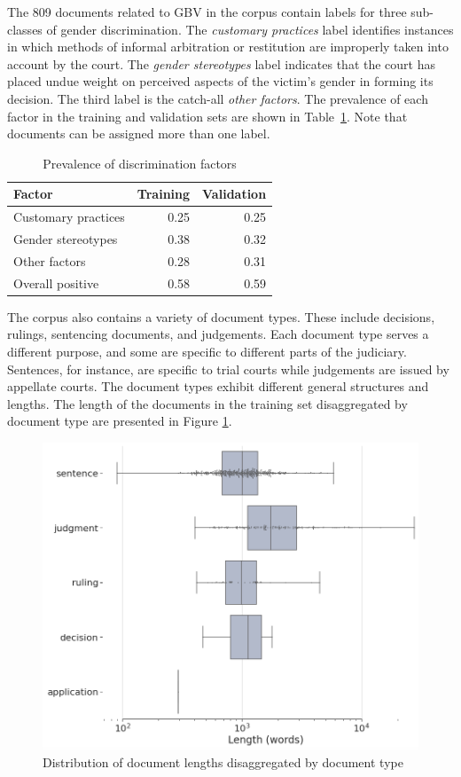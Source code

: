 \documentclass[twocolumn,10pt]{wmrDoc}
\begin{document}
The 809 documents related to GBV in the corpus contain labels for three sub-classes of gender discrimination.  The \emph{customary practices} label identifies instances in which methods of informal arbitration or restitution are improperly taken into account by the court.  The \emph{gender stereotypes} label indicates that the court has placed undue weight on perceived aspects of the victim's gender in forming its decision.  The third label is the catch-all \emph{other factors}.  The prevalence of each factor in the training and validation sets are shown in Table~\ref{tab:disc_type}.  Note that documents can be assigned more than one label.

\begin{table}
 \caption{Prevalence of discrimination factors}
  \centering
  \begin{tabular}{lrr}
    \toprule
    Factor   & Training  & Validation \\
    \midrule
    Customary practices & 0.25  & 0.25 \\
    Gender stereotypes  & 0.38  & 0.32 \\
    Other factors       & 0.28  & 0.31 \\
    \midrule
    Overall positive    & 0.58  & 0.59 \\
    \bottomrule
  \end{tabular}
  \label{tab:disc_type}
\end{table}

The corpus also contains a variety of document types.  These include decisions, rulings, sentencing documents, and judgements.  Each document type serves a different purpose, and some are specific to different parts of the judiciary.  Sentences, for instance, are specific to trial courts while judgements are issued by appellate courts. The document types exhibit different general structures and lengths.  The length of the documents in the training set disaggregated by document type are presented in Figure \ref{fig:boxplot}.

\begin{figure}[h]
    \centering
    \includegraphics[width=.45\textwidth]{images/boxplot.png}
    \caption{Distribution of document lengths disaggregated by document type}
    \label{fig:boxplot}
\end{figure}
\end{document}
